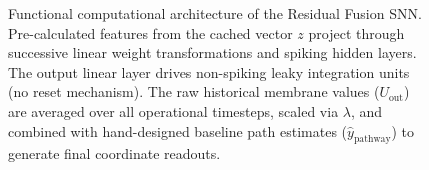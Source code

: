 \begin{figure}[htbp]
\begin{tikzpicture}
    \end{tikzpicture}
    \caption{Functional computational architecture of the Residual Fusion SNN. Pre-calculated features from the cached vector $z$ project through successive linear weight transformations and spiking hidden layers. The output linear layer drives non-spiking leaky integration units (no reset mechanism). The raw historical membrane values ($U_{\text{out}}$) are averaged over all operational timesteps, scaled via $\lambda$, and combined with hand-designed baseline path estimates ($\hat{y}_{\text{pathway}}$) to generate final coordinate readouts.}
    \label{fig:fusion_snn_architecture}
\end{figure}
